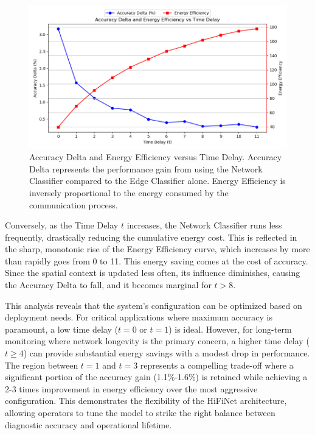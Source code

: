 \begin{figure}
  \centering
  \includegraphics[width=\textwidth]{images/accuracy_tradeoff.png}
  \caption{Accuracy Delta and Energy Efficiency versus Time Delay.  Accuracy Delta represents the performance gain from using the Network Classifier compared to the Edge Classifier alone. Energy Efficiency is inversely proportional to the energy consumed by the communication process.}
  \label{fig:accuracy_tradeoff}
\end{figure}

Conversely, as the Time Delay \(t\) increases, the Network Classifier runs less frequently, drastically reducing the cumulative energy cost. This is reflected in the sharp, monotonic rise of the Energy Efficiency curve, which increases by more than rapidly goes from 0 to 11. This energy saving comes at the cost of accuracy. Since the spatial context is updated less often, its influence diminishes, causing the Accuracy Delta to fall,  and it becomes marginal for \(t > 8\).

This analysis reveals that the system's configuration can be optimized based on deployment needs. For critical applications where maximum accuracy is paramount, a low time delay (\(t=0\) or \(t=1\)) is ideal. However, for long-term monitoring where network longevity is the primary concern, a higher time delay (\(t\ge4\)) can provide substantial energy savings with a modest drop in performance. The region between \(t=1\) and \(t=3\) represents a compelling trade-off where a significant portion of the accuracy gain (1.1\%-1.6\%) is retained while achieving a 2-3 times improvement in energy efficiency over the most aggressive configuration. This demonstrates the flexibility of the HiFiNet architecture, allowing operators to tune the model to strike the right balance between diagnostic accuracy and operational lifetime.
